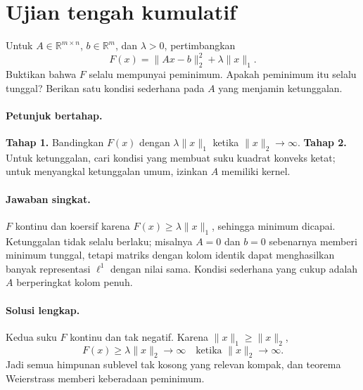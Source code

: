 
\section{Ujian tengah kumulatif}
\label{orig03:midterm}

\begin{exercise}
\label{orig03:midterm:exercise:0001}
Untuk $A\in\mathbb R^{m\times n}$, $b\in\mathbb R^m$, dan $\lambda>0$,
pertimbangkan
\[
 F(x)=\lVert Ax-b\rVert_2^2+\lambda\lVert x\rVert_1.
\]
Buktikan bahwa $F$ selalu mempunyai peminimum. Apakah peminimum itu selalu
tunggal? Berikan satu kondisi sederhana pada $A$ yang menjamin ketunggalan.
\end{exercise}

\paragraph{Petunjuk bertahap.}
\label{orig03:midterm:hint:0001}
\textbf{Tahap 1.} Bandingkan $F(x)$ dengan $\lambda\lVert x\rVert_1$ ketika
$\lVert x\rVert_2\to\infty$.
\textbf{Tahap 2.} Untuk ketunggalan, cari kondisi yang membuat suku kuadrat
konveks ketat; untuk menyangkal ketunggalan umum, izinkan $A$ memiliki
kernel.

\paragraph{Jawaban singkat.}
\label{orig03:midterm:answer:0001}
$F$ kontinu dan koersif karena
$F(x)\ge\lambda\lVert x\rVert_1$, sehingga minimum dicapai. Ketunggalan tidak
selalu berlaku; misalnya $A=0$ dan $b=0$ sebenarnya memberi minimum tunggal,
tetapi matriks dengan kolom identik dapat menghasilkan banyak representasi
$\ell^1$ dengan nilai sama. Kondisi sederhana yang cukup adalah $A$ berperingkat
kolom penuh.

\paragraph{Solusi lengkap.}
\label{orig03:midterm:solution:0001}
Kedua suku $F$ kontinu dan tak negatif. Karena
$\lVert x\rVert_1\ge\lVert x\rVert_2$,
\[
 F(x)\ge\lambda\lVert x\rVert_2\longrightarrow\infty
 \quad\text{ketika }\lVert x\rVert_2\to\infty.
\]
Jadi semua himpunan sublevel tak kosong yang relevan kompak, dan teorema
Weierstrass memberi keberadaan peminimum.

